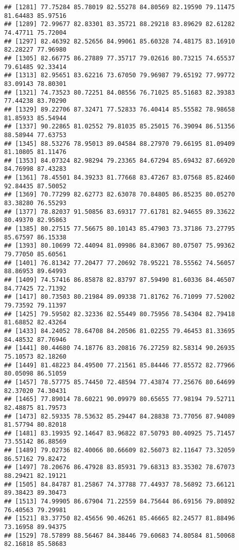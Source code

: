 \documentclass[
]{article}
\begin{document}
\begin{verbatim}
## [1281] 77.75284 85.78019 82.55278 84.80569 82.19590 79.11475 81.64483 85.97516
## [1289] 72.99677 82.83301 83.35721 88.29218 83.89629 82.61282 74.47711 75.72004
## [1297] 82.46392 82.52656 84.99061 85.60328 74.48175 83.16910 82.28227 77.96980
## [1305] 82.66775 86.27889 77.35717 79.02616 80.73215 74.65537 79.61485 92.33414
## [1313] 82.95651 83.62216 73.67050 79.96987 79.65192 77.99772 83.09143 78.80301
## [1321] 74.73523 80.72251 84.08556 76.71025 85.51683 82.39383 77.44238 83.70290
## [1329] 89.22706 87.32471 77.52833 76.40414 85.55582 78.98658 81.85933 85.54944
## [1337] 90.22865 81.02552 79.81035 85.25015 76.39094 86.51356 88.58944 77.63753
## [1345] 88.53276 78.95013 89.04584 88.27970 79.66195 81.09409 81.10805 81.11476
## [1353] 84.07324 82.98294 79.23365 84.67294 85.69432 87.66920 84.76998 87.43283
## [1361] 78.45501 84.39233 81.77668 83.47267 83.07568 85.82460 92.84435 87.50052
## [1369] 70.77299 82.62773 82.63078 70.84805 86.85235 80.05270 83.38280 76.55293
## [1377] 78.82037 91.50856 83.69317 77.61781 82.94655 89.33622 80.49370 82.95863
## [1385] 80.27515 77.56675 80.10143 85.47903 73.37186 73.27795 85.67597 86.15338
## [1393] 80.10699 72.44094 81.09986 84.83067 80.07507 75.99362 79.77050 85.60561
## [1401] 76.81342 77.20477 77.20692 78.95221 78.55562 74.56057 88.86953 89.64993
## [1409] 74.57416 86.85878 82.83797 87.59490 81.60336 84.46507 84.77425 72.71392
## [1417] 80.73503 80.21984 89.09338 71.81762 76.71099 77.52002 79.73592 79.11397
## [1425] 79.59502 82.32336 82.55449 80.75956 78.54304 82.79418 81.68852 82.43264
## [1433] 84.24052 78.64708 84.20506 81.02255 79.46453 81.33695 84.48532 87.76946
## [1441] 80.44680 74.18776 83.20816 76.27259 82.58314 90.26935 75.10573 82.18260
## [1449] 81.48223 84.49500 77.21561 85.84446 77.85572 82.77966 80.05098 86.51059
## [1457] 78.57775 85.74450 72.48594 77.43874 77.25676 80.64699 82.37020 74.30431
## [1465] 77.89014 78.60221 90.09979 80.65655 77.98194 79.52711 82.48875 81.79573
## [1473] 82.59335 78.53632 85.29447 84.28838 73.77056 87.94089 81.57794 80.82018
## [1481] 83.19935 92.14647 83.96822 87.50793 80.40925 75.71457 73.55142 86.88569
## [1489] 79.02736 82.40066 80.66609 82.56073 82.11647 73.32059 86.57162 79.82472
## [1497] 78.20676 86.47928 83.85931 79.68313 83.35302 78.67073 88.29421 82.19121
## [1505] 84.84787 81.25867 74.37788 77.44937 78.56892 73.66121 89.38423 89.30473
## [1513] 74.99905 86.67904 71.22559 84.75644 86.69156 79.80892 76.40563 79.29981
## [1521] 83.37750 82.45656 90.46261 85.46665 82.24577 81.88496 73.16958 89.94375
## [1529] 78.57899 88.56467 84.38446 79.60683 74.80584 81.50068 82.16818 85.58683

\end{verbatim}
\end{document}
